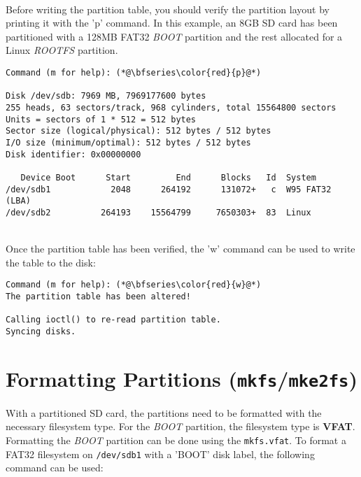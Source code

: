 
~\\
\noindent
Before writing the partition table, you should verify the partition layout by printing it with the 'p' command. In this example, an 8GB SD card has been partitioned with a 128MB FAT32 \textit{BOOT} partition and the rest allocated for a Linux \textit{ROOTFS} partition. \\

\begin{lstlisting}[style=text]
Command (m for help): (*@\bfseries\color{red}{p}@*)

Disk /dev/sdb: 7969 MB, 7969177600 bytes
255 heads, 63 sectors/track, 968 cylinders, total 15564800 sectors
Units = sectors of 1 * 512 = 512 bytes
Sector size (logical/physical): 512 bytes / 512 bytes
I/O size (minimum/optimal): 512 bytes / 512 bytes
Disk identifier: 0x00000000

   Device Boot      Start         End      Blocks   Id  System
/dev/sdb1            2048      264192      131072+   c  W95 FAT32 (LBA)
/dev/sdb2          264193    15564799     7650303+  83  Linux
\end{lstlisting}

~\\
\noindent
Once the partition table has been verified, the 'w' command can be used to write the table to the disk: \\
\begin{lstlisting}[style=text]
Command (m for help): (*@\bfseries\color{red}{w}@*)
The partition table has been altered!

Calling ioctl() to re-read partition table.
Syncing disks.
\end{lstlisting}

\section{Formatting Partitions (\texttt{mkfs}/\texttt{mke2fs})}
With a partitioned SD card, the partitions need to be formatted with the necessary filesystem type. For the \textit{BOOT} partition, the filesystem type is \textbf{VFAT}. Formatting the \textit{BOOT} partition can be done using the \texttt{mkfs.vfat}. To format a FAT32 filesystem on \texttt{/dev/sdb1} with a 'BOOT' disk label, the following command can be used: \\

